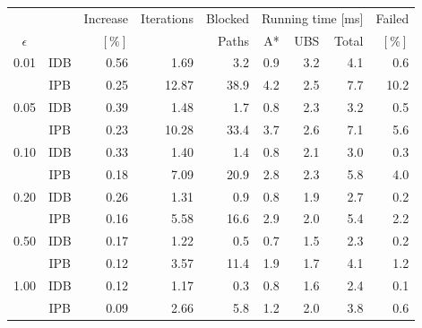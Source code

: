 \begin{tabular}{ccrrrrrrr}
\toprule
            & & Increase & Iterations & Blocked & \multicolumn{3}{c}{Running time [ms]} & Failed \\ \cmidrule(lr){6-8}
 $\epsilon$ & &   $[\%]$ &            &   Paths & A* & UBS & Total                      & $[\%]$ \\
\midrule
\multirow{2}{*}{0.01} & IDB &                     0.56 &            1.69 &                  3.2 &                        0.9 &                3.2 &              4.1 &     0.6 \\
                      & IPB &                     0.25 &           12.87 &                 38.9 &                        4.2 &                2.5 &              7.7 &    10.2 \\[2pt]
\multirow{2}{*}{0.05} & IDB &                     0.39 &            1.48 &                  1.7 &                        0.8 &                2.3 &              3.2 &     0.5 \\
                      & IPB &                     0.23 &           10.28 &                 33.4 &                        3.7 &                2.6 &              7.1 &     5.6 \\[2pt]
\multirow{2}{*}{0.10} & IDB &                     0.33 &            1.40 &                  1.4 &                        0.8 &                2.1 &              3.0 &     0.3 \\
                      & IPB &                     0.18 &            7.09 &                 20.9 &                        2.8 &                2.3 &              5.8 &     4.0 \\[2pt]
\multirow{2}{*}{0.20} & IDB &                     0.26 &            1.31 &                  0.9 &                        0.8 &                1.9 &              2.7 &     0.2 \\
                      & IPB &                     0.16 &            5.58 &                 16.6 &                        2.9 &                2.0 &              5.4 &     2.2 \\[2pt]
\multirow{2}{*}{0.50} & IDB &                     0.17 &            1.22 &                  0.5 &                        0.7 &                1.5 &              2.3 &     0.2 \\
                      & IPB &                     0.12 &            3.57 &                 11.4 &                        1.9 &                1.7 &              4.1 &     1.2 \\[2pt]
\multirow{2}{*}{1.00} & IDB &                     0.12 &            1.17 &                  0.3 &                        0.8 &                1.6 &              2.4 &     0.1 \\
                      & IPB &                     0.09 &            2.66 &                  5.8 &                        1.2 &                2.0 &              3.8 &     0.6 \\
\bottomrule
\end{tabular}

